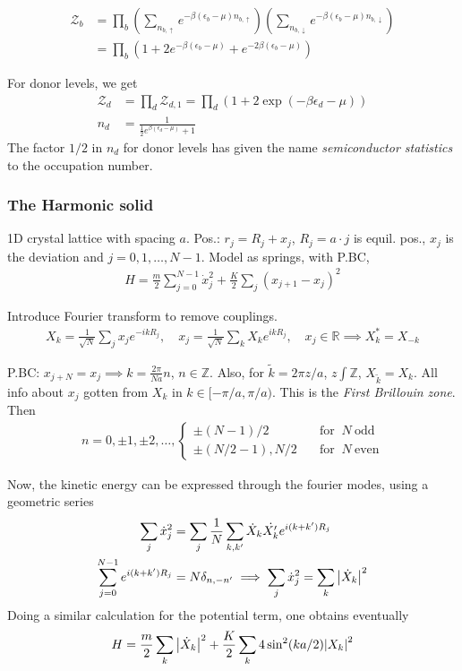 \documentclass[a4paper, english, 12pt]{article}
\newcommand{\eps}{\epsilon}
\newcommand{\closed}[1]{\left( #1 \right)}
\newcommand{\Z}{\mathcal{Z}}
\begin{document}
\begin{multicols*}{2}
\begin{align*}
    \Z_b &= \prod_b \closed{\sum_{n_{b,\uparrow}} e^{-\beta(\eps_b-\mu)n_{b,\uparrow}} } \closed{\sum_{n_{b,\downarrow}} e^{-\beta(\eps_b-\mu)n_{b,\downarrow}} } \\ 
    &= \prod_b \closed{1 + 2 e^{-\beta(\eps_b-\mu)} + e^{-2\beta(\eps_b-\mu)}}
\end{align*}

For donor levels, we get 
\begin{align*}
    \Z_d &= \prod_d \Z_{d,1} =  \prod_d (1+2\exp(-\beta\eps_d - \mu)) \\ 
    n_d &= \frac{1}{\frac{1}{2}e^{\beta(\eps_d-\mu)}+1}
\end{align*} 
The factor $1/2$ in $n_d$ for donor levels has given the name \textit{semiconductor statistics} to the occupation number. 



\subsubsection*{The Harmonic solid}
1D crystal lattice with spacing $a$. Pos.: $r_j = R_j + x_j$, $R_j=a\cdot j$ is equil. pos., $x_j$ is the deviation and $j=0,1,\dots,N-1$. Model as springs, with P.BC, 
\begin{align*}
    H = \frac{m}{2}\sum_{j=0}^{N-1} \dot{x}_j^2 + \frac{K}{2} \sum_j (x_{j+1}-x_j)^2
\end{align*}

Introduce Fourier transform to remove couplings.
\begin{align*}
    X_k = \frac{1}{\sqrt{N}} \sum_j x_j e^{-ikR_j},\quad x_j = \frac{1}{\sqrt{N}} \sum_k X_k e^{ikR_j},\quad x_j\in\mathbb{R}\implies X_k^* = X_{-k}
\end{align*}

P.BC: $x_{j+N}=x_j\implies k = \frac{2\pi}{Na}n$, $n\in\mathbb{Z}$. Also, for $\tilde{k}=2\pi z/a$, $z\int\mathbb{Z}$, $X_{\tilde{k}}=X_k$. All info about $x_j$ gotten from $X_k$ in $k\in[-\pi/a,\pi/a)$. This is the \textit{First Brillouin zone}. Then 
\begin{align*}
    n = 0,\pm1,\pm2,\dots, \begin{cases}
        \pm(N-1)/2 \quad&\text{for }\: N\: \text{odd} \\ 
        \pm(N/2-1),N/2\quad&\text{for }\: N\: \text{even}
    \end{cases}
\end{align*}


Now, the kinetic energy can be expressed through the fourier modes, using a geometric series 
\begin{align*}
    \sum_j \dot{x}_j^2 &= \sum_j \frac{1}{N}\sum_{k,k'}\dot{X}_k \dot{X_k'} e^{i(k+k')R_j} \\ 
    \sum_{j=0}^{N-1} e^{i(k+k')R_j} &= N\delta_{n,-n'} \implies \sum_j \dot{x}_j^2 =  \sum_k \abs{\dot{X}_k}^2 
\end{align*}
Doing a similar calculation for the potential term, one obtains eventually 
\begin{align*}
    H = \frac{m}{2} \sum_k \abs{\dot{X}_k}^2 + \frac{K}{2} \sum_k 4\sin^2(ka/2) \abs{X_k}^2
\end{align*}


\end{multicols*}
\end{document}
